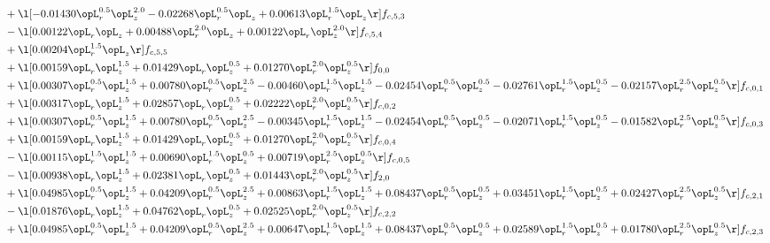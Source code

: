 \begin{alignat}{2}
& + \l[  -0.01430 \opL_r^{0.5} \opL_z^{2.0}   -0.02268 \opL_r^{0.5} \opL_z +  0.00613 \opL_r^{1.5} \opL_z  \r] f_{c,5,3} \nonumber \\ 
& - \l[  0.00122 \opL_r \opL_z +  0.00488 \opL_r^{2.0} \opL_z +  0.00122 \opL_r \opL_z^{2.0}  \r] f_{c,5,4} \nonumber \\ 
& + \l[  0.00204 \opL_r^{1.5} \opL_z  \r] f_{c,5,5} \nonumber \\ 
& + \l[  0.00159 \opL_r \opL_z^{1.5} +  0.01429 \opL_r \opL_z^{0.5} +  0.01270 \opL_r^{2.0} \opL_z^{0.5}  \r] f_{0,0} \nonumber \\ 
& + \l[  0.00307 \opL_r^{0.5} \opL_z^{1.5} +  0.00780 \opL_r^{0.5} \opL_z^{2.5}   -0.00460 \opL_r^{1.5} \opL_z^{1.5}   -0.02454 \opL_r^{0.5} \opL_z^{0.5}   -0.02761 \opL_r^{1.5} \opL_z^{0.5}   -0.02157 \opL_r^{2.5} \opL_z^{0.5}  \r] f_{c,0,1} \nonumber \\ 
& + \l[  0.00317 \opL_r \opL_z^{1.5} +  0.02857 \opL_r \opL_z^{0.5} +  0.02222 \opL_r^{2.0} \opL_z^{0.5}  \r] f_{c,0,2} \nonumber \\ 
& + \l[  0.00307 \opL_r^{0.5} \opL_z^{1.5} +  0.00780 \opL_r^{0.5} \opL_z^{2.5}   -0.00345 \opL_r^{1.5} \opL_z^{1.5}   -0.02454 \opL_r^{0.5} \opL_z^{0.5}   -0.02071 \opL_r^{1.5} \opL_z^{0.5}   -0.01582 \opL_r^{2.5} \opL_z^{0.5}  \r] f_{c,0,3} \nonumber \\ 
& + \l[  0.00159 \opL_r \opL_z^{1.5} +  0.01429 \opL_r \opL_z^{0.5} +  0.01270 \opL_r^{2.0} \opL_z^{0.5}  \r] f_{c,0,4} \nonumber \\ 
& - \l[  0.00115 \opL_r^{1.5} \opL_z^{1.5} +  0.00690 \opL_r^{1.5} \opL_z^{0.5} +  0.00719 \opL_r^{2.5} \opL_z^{0.5}  \r] f_{c,0,5} \nonumber \\ 
& - \l[  0.00938 \opL_r \opL_z^{1.5} +  0.02381 \opL_r \opL_z^{0.5} +  0.01443 \opL_r^{2.0} \opL_z^{0.5}  \r] f_{2,0} \nonumber \\ 
& + \l[  0.04985 \opL_r^{0.5} \opL_z^{1.5} +  0.04209 \opL_r^{0.5} \opL_z^{2.5} +  0.00863 \opL_r^{1.5} \opL_z^{1.5} +  0.08437 \opL_r^{0.5} \opL_z^{0.5} +  0.03451 \opL_r^{1.5} \opL_z^{0.5} +  0.02427 \opL_r^{2.5} \opL_z^{0.5}  \r] f_{c,2,1} \nonumber \\ 
& - \l[  0.01876 \opL_r \opL_z^{1.5} +  0.04762 \opL_r \opL_z^{0.5} +  0.02525 \opL_r^{2.0} \opL_z^{0.5}  \r] f_{c,2,2} \nonumber \\ 
& + \l[  0.04985 \opL_r^{0.5} \opL_z^{1.5} +  0.04209 \opL_r^{0.5} \opL_z^{2.5} +  0.00647 \opL_r^{1.5} \opL_z^{1.5} +  0.08437 \opL_r^{0.5} \opL_z^{0.5} +  0.02589 \opL_r^{1.5} \opL_z^{0.5} +  0.01780 \opL_r^{2.5} \opL_z^{0.5}  \r] f_{c,2,3} \nonumber \\ 

\end{alignat}
